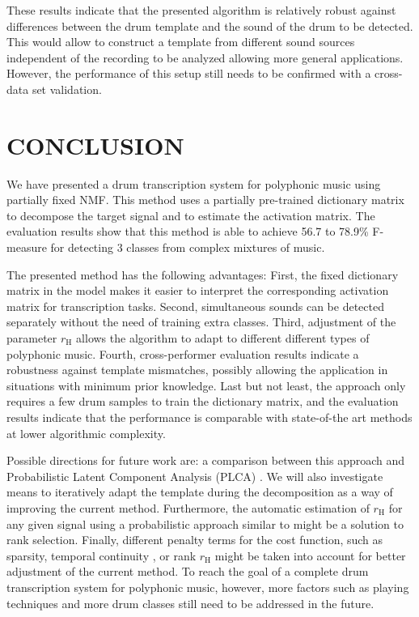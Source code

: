 \documentclass[a4paper]{article}
\begin{document}
These results indicate that the presented algorithm is relatively robust against differences between the drum template and the sound of the drum to be detected. This would allow to construct a template from different sound sources independent of the recording to be analyzed allowing more general applications. However, the performance of this setup still needs to be confirmed with a cross-data set validation.

\section{CONCLUSION}\label{sec:Conclusion}

We have presented a drum transcription system for polyphonic music using partially fixed NMF. This method uses a partially pre-trained dictionary matrix to decompose the target signal and to estimate the activation matrix. The evaluation results show that this method is able to achieve 56.7 to 78.9\% F-measure for detecting 3 classes from complex mixtures of music. 

The presented method has the following advantages: 
First, the fixed dictionary matrix in the model makes it easier to interpret the corresponding activation matrix for transcription tasks.
Second, simultaneous sounds can be detected separately without the need of training extra classes.  
Third, adjustment of the parameter $r_\mathrm{H}$ allows the algorithm to adapt to different different types of polyphonic music. 
Fourth, cross-performer evaluation results indicate a robustness against template mismatches, possibly allowing the application in situations with minimum prior knowledge. 
Last but not least, the approach only requires a few drum samples to train the dictionary matrix, and the evaluation results indicate that the performance is comparable with state-of-the art methods at lower algorithmic complexity. 

Possible directions for future work are: 
a comparison between this approach and Probabilistic Latent Component Analysis (PLCA) \cite{smaragdis_plca_2014}. We will also investigate means to iteratively adapt the template during the decomposition as a way of improving the current method. %
Furthermore, the automatic estimation of $r_\mathrm{H}$ for any given signal using a probabilistic approach similar to  \cite{ouo_inmf_2010} might be a solution to rank selection. Finally, different penalty terms for the cost function, such as sparsity, temporal continuity \cite{Virtanen_ssnmf_2007}, or rank $r_\mathrm{H}$ might be taken into account for better adjustment of the current method. To reach the goal of a complete drum transcription system for polyphonic music, however, more factors such as playing techniques and more drum classes still need to be addressed in the future. 
\end{document}

